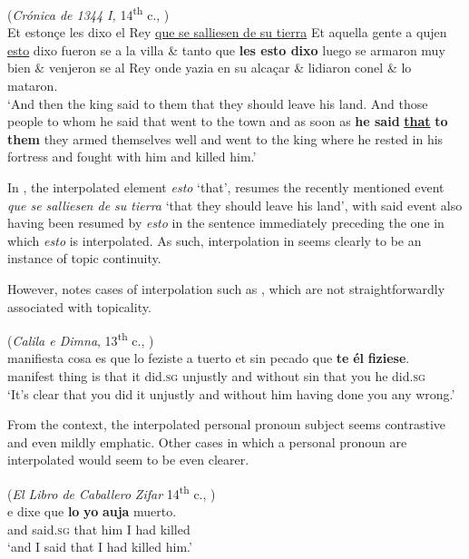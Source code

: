 \documentclass[output=paper]{LSP/langsci}
\begin{document}
\ea%
    \label{ex:poole:6}
    (\textit{Crónica de 1344 I,} 14\textsuperscript{th} c., \citealt[(19)]{Poole2013})\\
    Et estonçe les dixo el Rey \ul{que se salliesen de su tierra} Et aquella gente a qujen \ul{esto} dixo fueron se a la villa \& tanto que \textbf{les esto dixo} luego se armaron muy bien \& venjeron se al Rey onde yazia en su alcaçar \& lidiaron conel \& lo mataron. \\
    \glt ‘And then the king said to them that they should leave his land.  And those people to whom he said that went to the town and as soon as \textbf{he said} \textbf{\ul{that}} \textbf{to them} they armed themselves well and went to the king where he rested in his fortress and fought with him and killed him.’

    \z

\noindent In , the interpolated element \textit{esto} ‘that’, resumes the recently mentioned event \textit{que se salliesen de su tierra} ‘that they should leave his land’, with said event also having been resumed by \textit{esto} in the sentence immediately preceding the one in which \textit{esto} is interpolated.  As such, interpolation in  seems clearly to be an instance of topic continuity.

However, \citet[90]{Poole2013} notes cases of interpolation such as , which are not straightforwardly associated with topicality.

\ea%
    \label{ex:poole:7}(\textit{Calila e Dimna}, 13\textsuperscript{th} c., \citealt[(13)]{Poole2007})\\
    \gll   manifiesta cosa es que lo feziste {a tuerto} et sin pecado que \textbf{te} \textbf{él} \textbf{fiziese}. \\
	  manifest thing is that it did.\textsc{sg} unjustly and without sin that you he did.\textsc{sg}\\
    \glt ‘It’s clear that you did it unjustly and without him having done you any wrong.’
    \z 

\noindent From the context, the interpolated personal pronoun subject seems contrastive and even mildly emphatic.  Other cases in which a personal pronoun are interpolated would seem to be even clearer.

\ea%
    \label{ex:poole:8}
(\textit{El Libro de Caballero} \textit{Zifar} 14\textsuperscript{th} c., \citealt[(2b)]{Poole2007})\\  
    \gll     e dixe que \textbf{lo} \textbf{yo} \textbf{auja} muerto.\\
	 and said.\textsc{sg} that him I had killed\\
    \glt  ‘and I said that I had killed him.’
    \z
\end{document}
